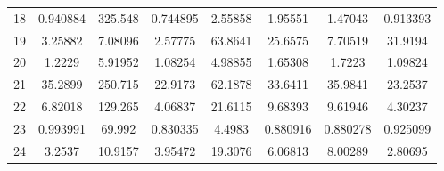 \begin{center}
\begin{longtable}{cccccccc}
18 & 0.940884 & 325.548 & 0.744895 & 2.55858 & 1.95551 & 1.47043 & 0.913393\\
19 & 3.25882 & 7.08096 & 2.57775 & 63.8641 & 25.6575 & 7.70519 & 31.9194\\
20 & 1.2229 & 5.91952 & 1.08254 & 4.98855 & 1.65308 & 1.7223 & 1.09824\\
21 & 35.2899 & 250.715 & 22.9173 & 62.1878 & 33.6411 & 35.9841 & 23.2537\\
22 & 6.82018 & 129.265 & 4.06837 & 21.6115 & 9.68393 & 9.61946 & 4.30237\\
23 & 0.993991 & 69.992 & 0.830335 & 4.4983 & 0.880916 & 0.880278 & 0.925099\\
24 & 3.2537 & 10.9157 & 3.95472 & 19.3076 & 6.06813 & 8.00289 & 2.80695\\
\end{longtable}
\end{center}



